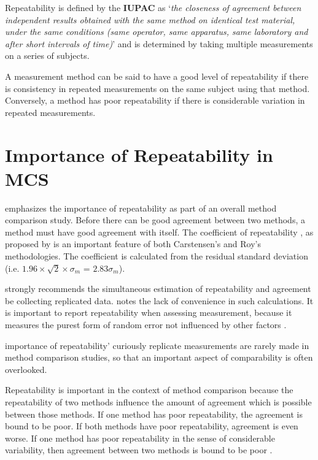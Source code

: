 \documentclass[12pt, a4paper]{article}
\begin{document}
Repeatability is defined by the \textbf{IUPAC} as `\textit{the closeness of agreement between independent results obtained with the same method on identical test material, under the same conditions (same
operator, same apparatus, same laboratory and after short intervals of time)}'  and is determined by taking multiple measurements on a series of subjects.

A measurement method can be said to have a good level of repeatability if there is consistency in repeated measurements on the same subject using that method. Conversely, a method has poor repeatability if there is considerable variation in repeated measurements.

	

\section{Importance of Repeatability in MCS}

\citet{Barnhart} emphasizes the importance of repeatability as part of an overall method comparison study. Before there can be good agreement between two methods, a method must have good agreement with itself. The coefficient of repeatability , as proposed by \citet{BA99} is an important feature of both Carstensen's and Roy's methodologies. The coefficient is calculated from the residual standard deviation (i.e. $1.96 \times \sqrt{2} \times \sigma_m$ = $2.83 \sigma_m$).

\bigskip

\citet{BA99} strongly recommends the simultaneous estimation of repeatability and agreement be collecting replicated data. \citet{ARoy2009} notes the lack of convenience in such calculations.
It is important to report repeatability when assessing measurement, because it measures the purest form of random error not influenced by other factors \citep{Barnhart}.	

importance of repeatability' curiously replicate measurements are rarely made in method comparison studies, so that an important aspect of comparability is often overlooked.

Repeatability is important in the context of method comparison because the repeatability of two methods influence the amount of agreement which is possible between those methods. If one method has poor repeatability, the agreement is bound to be poor. If both methods have poor repeatability, agreement is even worse. If one method has poor repeatability in the sense of considerable variability, then agreement between two methods is bound to be poor \citep{ARoy2009}.
\end{document}
